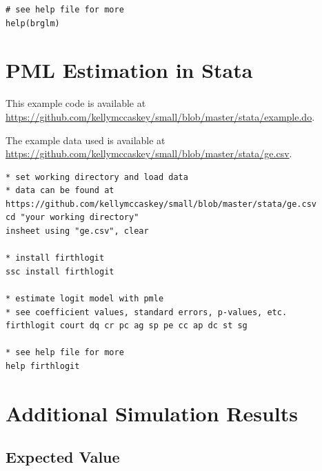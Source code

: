 \documentclass[12pt]{article}
\begin{document}
\begin{appendix}
\begin{footnotesize}
\begin{verbatim}
# see help file for more
help(brglm)
\end{verbatim}
\end{footnotesize}

\section{PML Estimation in Stata}\label{sec:pmle-in-stata}

This example code is available at \href{https://github.com/kellymccaskey/small/blob/master/stata/example.do}{https://github.com/kellymccaskey/small/blob/master/stata/example.do}.

\noindent The example data used is available at \href{https://github.com/kellymccaskey/small/blob/master/stata/GE.dta}{https://github.com/kellymccaskey/small/blob/master/stata/ge.csv}.

\begin{footnotesize}
\begin{verbatim}
* set working directory and load data
* data can be found at https://github.com/kellymccaskey/small/blob/master/stata/ge.csv
cd "your working directory"
insheet using "ge.csv", clear

* install firthlogit
ssc install firthlogit

* estimate logit model with pmle
* see coefficient values, standard errors, p-values, etc.
firthlogit court dq cr pc ag sp pe cc ap dc st sg

* see help file for more
help firthlogit

\end{verbatim}
\end{footnotesize}


\section{Additional Simulation Results}\label{sec:app-sims}

\subsection{Expected Value}


\end{appendix}
\end{document}
